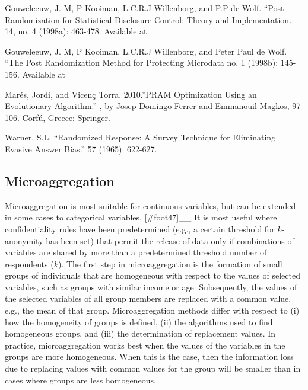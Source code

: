 \documentclass[letterpaper,10pt,english]{sphinxmanual}
\begin{document}
\begin{DUlineblock}{0em}
\item[] 
\item[] \sphinxcode{\sphinxupquote{\#\# - - - - - - - - - - -}}
\item[] 
\end{DUlineblock}


Gouweleeuw, J. M, P Kooiman, L.C.R.J Willenborg, and P.P de Wolf. “Post
Randomization for Statistical Disclosure Control: Theory and
Implementation. 14, no. 4 (1998a):
463-478. Available at

Gouweleeuw, J. M, P Kooiman, L.C.R.J Willenborg, and Peter Paul de Wolf.
“The Post Randomization Method for Protecting Microdata no. 1 (1998b):
145-156. Available at

Marés, Jordi, and Vicenç Torra. 2010.”PRAM Optimization Using an
Evolutionary Algorithm.” , by Josep
Domingo-Ferrer and Emmanouil Magkos, 97-106. Corfú, Greece: Springer.

Warner, S.L. “Randomized Response: A Survey Technique for Eliminating
Evasive Answer Bias.”  57
(1965): 622-627.


\subsection{Microaggregation}
\label{\detokenize{anon_methods:microaggregation}}
Microaggregation is most suitable for continuous variables, but can be
extended in some cases to categorical variables. {[}\#foot47{]}\_\_
It is most useful where confidentiality rules have been predetermined
(e.g., a certain threshold for \(k\)-anonymity has been set) that
permit the release of data only if combinations of variables are shared
by more than a predetermined threshold number of respondents
(\(k\)). The first step in microaggregation is the formation of
small groups of individuals that are homogeneous with respect to the
values of selected variables, such as groups with similar income or age.
Subsequently, the values of the selected variables of all group members
are replaced with a common value, e.g., the mean of that group.
Microaggregation methods differ with respect to (i) how the homogeneity
of groups is defined, (ii) the algorithms used to find homogeneous
groups, and (iii) the determination of replacement values. In practice,
microaggregation works best when the values of the variables in the
groups are more homogeneous. When this is the case, then the information
loss due to replacing values with common values for the group will be
smaller than in cases where groups are less homogeneous.
\end{document}
